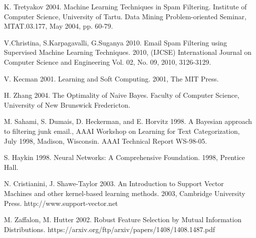 \documentclass[12pt]{report}
\begin{document}
\begin{thebibliography}{30}

 K. Tretyakov 2004. Machine Learning Techniques in Spam Filtering. Institute of Computer Science, University of Tartu. Data Mining Problem-oriented Seminar, MTAT.03.177, May 2004, pp. 60-79.

 V.Christina, S.Karpagavalli, G.Suganya 2010. Email Spam Filtering using Supervised Machine Learning Techniques. 2010, (IJCSE) International Journal on Computer Science and Engineering Vol. 02, No. 09, 2010, 3126-3129.

 V. Kecman 2001. Learning and Soft Computing. 2001, The MIT Press.

 H. Zhang 2004. The Optimality of Naive Bayes. Faculty of Computer Science, University of New Brunswick Fredericton.

 M. Sahami, S. Dumais, D. Heckerman, and E. Horvitz 1998. A Bayesian approach to filtering junk email., AAAI Workshop on Learning for Text Categorization, July 1998, Madison, Wisconsin. AAAI Technical Report WS-98-05.

 S. Haykin 1998. Neural Networks: A Comprehensive Foundation. 1998, Prentice
Hall.

 N. Cristianini, J. Shawe-Taylor 2003. An Introduction to Support Vector Machines and other kernel-based learning methods. 2003, Cambridge University Press. http://www.support-vector.net

 M. Zaffalon, M. Hutter 2002. Robust Feature Selection by Mutual Information Distributions. https://arxiv.org/ftp/arxiv/papers/1408/1408.1487.pdf

\end{thebibliography}
\end{document}
